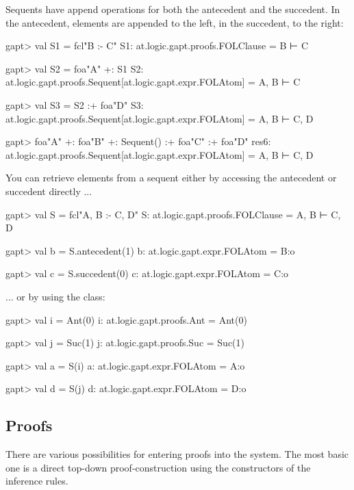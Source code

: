 \documentclass[a4paper,11pt]{article}
\newcommand{\cli}[1]{{\ttfamily {#1}}}
\begin{document}
Sequents have append operations for both the antecedent and the succedent. In the antecedent,
elements are appended to the left, in the succedent, to the right:

\begin{clilisting}
gapt> val S1 = fcl"B :- C"
S1: at.logic.gapt.proofs.FOLClause = B ⊢ C

gapt> val S2 = foa"A" +: S1
S2: at.logic.gapt.proofs.Sequent[at.logic.gapt.expr.FOLAtom] = A, B ⊢ C

gapt> val S3 = S2 :+ foa"D"
S3: at.logic.gapt.proofs.Sequent[at.logic.gapt.expr.FOLAtom] = A, B ⊢ C, D

gapt> foa"A" +: foa"B" +: Sequent() :+ foa"C" :+ foa"D"
res6: at.logic.gapt.proofs.Sequent[at.logic.gapt.expr.FOLAtom] = A, B ⊢ C, D

\end{clilisting}

You can retrieve elements from a sequent either by accessing the antecedent
or succedent directly ...
\begin{clilisting}
gapt> val S = fcl"A, B :- C, D"
S: at.logic.gapt.proofs.FOLClause = A, B ⊢ C, D

gapt> val b = S.antecedent(1)
b: at.logic.gapt.expr.FOLAtom = B:o

gapt> val c = S.succedent(0)
c: at.logic.gapt.expr.FOLAtom = C:o

\end{clilisting}
... or by using the \cli{SequentIndex} class:

\begin{clilisting}
gapt> val i = Ant(0)
i: at.logic.gapt.proofs.Ant = Ant(0)

gapt> val j = Suc(1)
j: at.logic.gapt.proofs.Suc = Suc(1)

gapt> val a = S(i)
a: at.logic.gapt.expr.FOLAtom = A:o

gapt> val d = S(j)
d: at.logic.gapt.expr.FOLAtom = D:o

\end{clilisting}


\subsection{Proofs}\label{sec:entering_proofs}

There are various possibilities for entering proofs into the system. The most
basic one is a direct top-down proof-construction using the constructors
of the inference rules.
\end{document}
